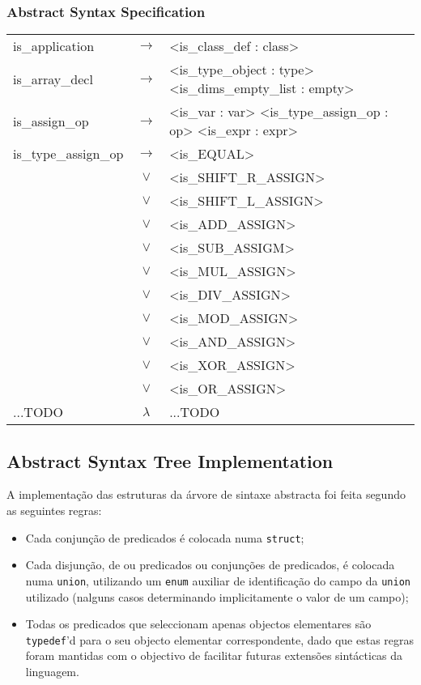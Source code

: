 \documentclass[a4paper]{article}
\begin{document}
\subsubsection{Abstract Syntax Specification}
\begin{longtable}{lcl}

	is\_application				& $\to$ & <is\_class\_def : class> \\
	is\_array\_decl 			& $\to$ & <is\_type\_object : type> <is\_dims\_empty\_list : empty> \\
	is\_assign\_op				& $\to$ & <is\_var : var> <is\_type\_assign\_op : op> <is\_expr : expr> \\
	is\_type\_assign\_op		& $\to$ & <is\_EQUAL> \\
								& $\vee$ & <is\_SHIFT\_R\_ASSIGN> \\
								& $\vee$ & <is\_SHIFT\_L\_ASSIGN> \\
								& $\vee$ & <is\_ADD\_ASSIGN> \\
								& $\vee$ & <is\_SUB\_ASSIGM> \\
								& $\vee$ & <is\_MUL\_ASSIGN> \\
								& $\vee$ & <is\_DIV\_ASSIGN> \\
								& $\vee$ & <is\_MOD\_ASSIGN> \\
								& $\vee$ & <is\_AND\_ASSIGN> \\
								& $\vee$ & <is\_XOR\_ASSIGN> \\
								& $\vee$ & <is\_OR\_ASSIGN> \\
								...TODO & $\lambda$ & ...TODO
\end{longtable}

\subsection{Abstract Syntax Tree Implementation}
A implementação das estruturas da árvore de sintaxe abstracta foi feita segundo as seguintes regras:
\begin{itemize}
	\item Cada conjunção de predicados é colocada numa \texttt{struct};
	\item Cada disjunção, de ou predicados ou conjunções de predicados, é colocada numa \texttt{union},
		utilizando um \texttt{enum} auxiliar de identificação do campo da \texttt{union} utilizado
		(nalguns casos determinando implicitamente o valor de um campo);
	\item Todas os predicados que seleccionam apenas objectos elementares são \texttt{typedef}'d para o seu objecto elementar correspondente,
		dado que estas regras foram mantidas com o objectivo de facilitar futuras extensões sintácticas da linguagem.
\end{itemize}
\end{document}
